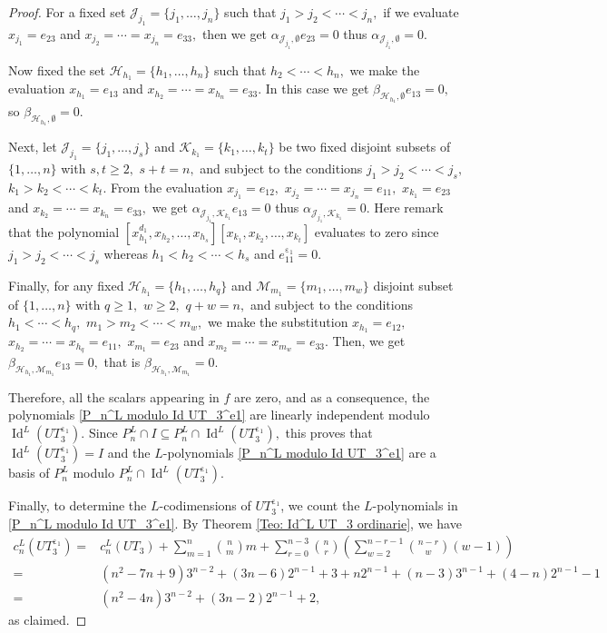 \documentclass[a4paper,reqno]{amsart}
\theoremstyle{definition}
\numberwithin{equation}{section}
\numberwithin{theorem}{section}
\DeclareMathOperator{\I}{Id}
\DeclareMathOperator{\e}{\varepsilon}
\begin{document}
\begin{proof}
For a fixed set $\mathcal{J}_{j_1}=\{j_1,\ldots,j_n\}$ such that $j_1>j_2<  \cdots < j_n,$ if we evaluate $ x_{j_1}= e_{23}$ and  $x_{j_2}=\cdots = x_{j_n}= e_{33},$ then we get $\alpha_{ \mathcal{J}_{j_1}, \emptyset} e_{23}=0$ thus $\alpha_{ \mathcal{J}_{j_1}, \emptyset} =0.$


Now fixed the set $\mathcal{H}_{h_1}=\{h_1,\ldots,h_n\}$ such that $h_2<  \cdots < h_n,$ we make the evaluation $ x_{h_1}= e_{13}$ and  $x_{h_2}=\cdots = x_{h_n}= e_{33}.$ In this case we get $\beta_{ \mathcal{H}_{h_1}, \emptyset}  e_{13}=0,$ so  $\beta_{ \mathcal{H}_{h_1}, \emptyset}=0.$


Next, let $\mathcal{J}_{j_1}=\{j_1,\ldots,j_s\}$ and $\mathcal{K}_{k_1}=\{k_1,\ldots,k_t\}$ be two fixed disjoint subsets of $\{1,\ldots,n\}$ with $s,t\geq 2,$ $s+t=n,$ and subject to the conditions $j_1>j_2<  \cdots < j_s,$  $k_1>k_2<  \cdots < k_t.$ From the evaluation $ x_{j_1}= e_{12},$  $x_{j_2}=\cdots = x_{j_n}= e_{11},$ $ x_{k_1}= e_{23}$ and  $x_{k_2}=\cdots = x_{k_n}= e_{33},$ we get $\alpha_{ \mathcal{J}_{j_1}, \mathcal{K}_{k_1}} e_{13}=0$ thus $\alpha_{ \mathcal{J}_{j_1}, \mathcal{K}_{k_1}}=0.$ Here remark that the polynomial $[x_{h_1}^{d_1},x_{h_2},\dots,x_{h_s}][x_{k_1},x_{k_2},\dots,x_{k_t}]$ evaluates to zero since $j_1>j_2<  \cdots < j_s$ whereas $h_1<h_2<\cdots <h_s$ and $e_{11}^{\e_1}=0.$

Finally, for any fixed $\mathcal{H}_{h_1}=\{h_1,\ldots,h_q\}$ and  $\mathcal{M}_{m_1}=\{m_1,\ldots,m_w\}$ disjoint subset of $\{1,\ldots,n\}$ with $q\geq 1,$ $w\geq 2,$ $q+w=n,$ and subject to the conditions $h_1< \cdots < h_q,$  $m_1>m_2<  \cdots < m_w,$ 
we make the substitution $x_{h_1}=e_{12},$ $x_{h_2}=\cdots = x_{h_q}= e_{11},$ $x_{m_1}=e_{23}$ and $x_{m_2}= \cdots = x_{m_w}= e_{33}.$ Then, we get $\beta_{\mathcal{H}_{h_1}, \mathcal{M}_{m_1}}e_{13}=0,$ that is $\beta_{\mathcal{H}_{h_1}, \mathcal{M}_{m_1}}=0.$

		Therefore, all the scalars appearing in $f$ are zero, and as a consequence, the polynomials  \eqref{P_n^L modulo Id UT_3^e1} are linearly independent modulo $\I^L(UT_3^{\e_1})$. Since $P_n^L\cap I\subseteq P_n^L\cap \I^L(UT_3^{\e_1}),$ this proves that $\I^L(UT_3^{\e_1})= I$ and the $L$-polynomials \eqref{P_n^L modulo Id UT_3^e1} are a basis of $P_n^L$ modulo $P_n^L\cap \I^L(UT_3^{\e_1}).$ 

   
        Finally, to determine the $L$-codimensions of $UT_3^{\e_1}$, we count the $L$-polynomials in \eqref{P_n^L modulo Id UT_3^e1}. By Theorem \ref{Teo: Id^L UT_3 ordinarie},  we have
   \begin{align*}
            c_n^L(UT_3^{\e_1})=&c_n^L(UT_3)+ \sum_{m=1}^n \binom{n}{m} m +\sum_{r=0}^{n-3}\binom{n}{r}\left( \sum_{w=2}^{n-r-1}\binom{n-r}{w}(w-1)\right)\\
                =&(n^2-7n+9) 3^{n-2}+ (3n-6)2^{n-1}+3+  n2^{n-1}+   (n-3)3^{n-1}+(4-n)2^{n-1}-1\\
                =& (n^2-4n)3^{n-2}+ (3n-2)2^{n-1}  +2,
        \end{align*}
        as claimed.
\end{proof}
\end{document}
